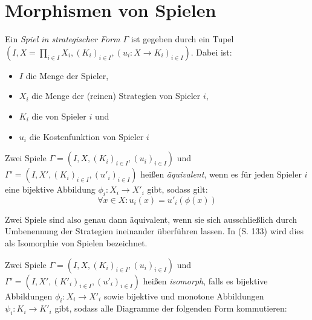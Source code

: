 \section{Morphismen von Spielen}

\begin{defn}
	Ein \emph{Spiel in strategischer Form $\Gamma$} ist gegeben durch ein Tupel $(I, X = \prod_{i \in I}X_i, (K_i)_{i\in I}, (u_i: X \to K_i)_{i\in I})$. Dabei ist:
	\begin{itemize}
		\item $I$ die Menge der Spieler,
		\item $X_i$ die Menge der (reinen) Strategien von Spieler $i$,
		\item $K_i$ die  von Spieler $i$ und
		\item $u_i$ die Kostenfunktion von Spieler $i$
	\end{itemize}
\end{defn}

\begin{defn}
	Zwei Spiele $\Gamma = (I, X, (K_i)_{i\in I}, (u_i)_{i\in I})$ und $\Gamma' = (I, X', (K_i)_{i\in I}, (u'_i)_{i\in I})$ heißen \emph{äquivalent}, wenn es für jeden Spieler $i$ eine bijektive Abbildung $\phi_i: X_i \to X'_i$ gibt, sodass gilt:
		\[\forall x \in X: u_i(x) = u'_i(\phi(x)) \]
\end{defn}

\begin{bem}
	Zwei Spiele sind also genau dann äquivalent, wenn sie sich ausschließlich durch Umbenennung der Strategien ineinander überführen lassen. In \cite{MonShap} (S. 133) wird dies als Isomorphie von Spielen bezeichnet.
\end{bem}

\begin{defn}\label{def:SpielIsomLap}
	Zwei Spiele $\Gamma = (I, X, (K_i)_{i\in I}, (u_i)_{i\in I})$ und $\Gamma' = (I, X', (K'_i)_{i\in I}, (u'_i)_{i\in I})$ heißen \emph{isomorph}, falls es bijektive Abbildungen $\phi_i: X_i \to X'_i$ sowie bijektive und monotone Abbildungen $\psi_i: K_i \to K'_i$ gibt, sodass alle Diagramme der folgenden Form kommutieren:
	
	\begin{center}
	\end{center}
\end{defn}

